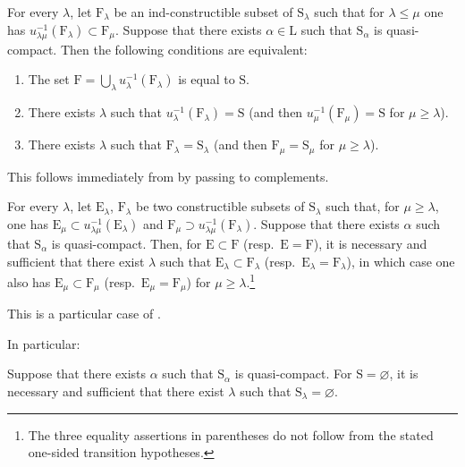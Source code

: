 \begin{corollary}[8.3.4]
\label{IV.8.3.4}
For every $\lambda$, let $\mathrm{F}_\lambda$ be an ind-constructible subset of $\mathrm{S}_\lambda$ such that for $\lambda\leqslant\mu$ one has $u_{\lambda\mu}^{-1}(\mathrm{F}_\lambda)\subset\mathrm{F}_\mu$.
Suppose that there exists $\alpha\in\mathrm{L}$ such that $\mathrm{S}_\alpha$ is quasi-compact.
Then the following conditions are equivalent:
\begin{enumerate}[label=\emph{\alph*)}]
  \item The set $\mathrm{F}=\bigcup_\lambda u_\lambda^{-1}(\mathrm{F}_\lambda)$ is equal to $\mathrm{S}$.
  \item There exists $\lambda$ such that $u_\lambda^{-1}(\mathrm{F}_\lambda)=\mathrm{S}$ \textup{(and then $u_\mu^{-1}(\mathrm{F}_\mu)=\mathrm{S}$ for $\mu\geqslant\lambda$)}.
  \item There exists $\lambda$ such that $\mathrm{F}_\lambda=\mathrm{S}_\lambda$ \textup{(and then $\mathrm{F}_\mu=\mathrm{S}_\mu$ for $\mu\geqslant\lambda$)}.
\end{enumerate}
This follows immediately from  by passing to complements.
\end{corollary}

\begin{corollary}[8.3.5]
\label{IV.8.3.5}
For every $\lambda$, let $\mathrm{E}_\lambda$, $\mathrm{F}_\lambda$ be two constructible subsets of $\mathrm{S}_\lambda$ such that, for $\mu\geqslant\lambda$, one has $\mathrm{E}_\mu\subset u_{\lambda\mu}^{-1}(\mathrm{E}_\lambda)$ and $\mathrm{F}_\mu\supset u_{\lambda\mu}^{-1}(\mathrm{F}_\lambda)$.
Suppose that there exists $\alpha$ such that $\mathrm{S}_\alpha$ is quasi-compact.
Then, for $\mathrm{E}\subset\mathrm{F}$ \textup{(resp.\ $\mathrm{E}=\mathrm{F}$)}, it is necessary and sufficient that there exist $\lambda$ such that $\mathrm{E}_\lambda\subset\mathrm{F}_\lambda$ \textup{(resp.\ $\mathrm{E}_\lambda=\mathrm{F}_\lambda$)}, in which case one also has $\mathrm{E}_\mu\subset\mathrm{F}_\mu$ \textup{(resp.\ $\mathrm{E}_\mu=\mathrm{F}_\mu$)} for $\mu\geqslant\lambda$.\footnote{The three equality assertions in parentheses do not follow from the stated one-sided transition hypotheses.}

This is a particular case of .
\end{corollary}

In particular:

\begin{corollary}[8.3.6]
\label{IV.8.3.6}
Suppose that there exists $\alpha$ such that $\mathrm{S}_\alpha$ is quasi-compact.
For $\mathrm{S}=\varnothing$, it is necessary and sufficient that there exist $\lambda$ such that $\mathrm{S}_\lambda=\varnothing$.
\end{corollary}

